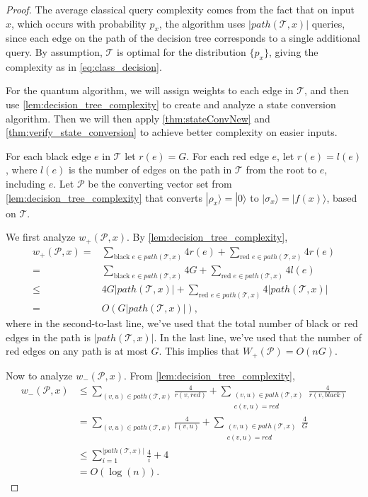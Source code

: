 \documentclass[cleveref, autoref, thm-restate,11pt]{article}
\theoremstyle{definition}
\newcommand{\sop}[1]{{\mathcal #1}}
\newcommand{\ket}[1]{|#1\rangle}
\renewcommand{\wp}[2]{{w_+({#1},{#2})}}
\newcommand{\wm}[2]{{w_-({#1},{#2})}}
\begin{document}
\begin{proof} 
The average classical query complexity comes from the fact that on input $x$,
which occurs with probability $p_x$, the algorithm uses $|path(\sop T,x)|$
queries, since each edge on the path of the decision tree corresponds
to a single additional query. By assumption, $\sop T$ is optimal for
the distribution $\{p_x\}$, giving the complexity as in \cref{eq:class_decision}.

For the quantum algorithm, we will assign weights to
each edge in $\sop T$, and then use \cref{lem:decision_tree_complexity} to create and analyze
a state conversion algorithm. Then we will then apply \cref{thm:stateConvNew} and
\cref{thm:verify_state_conversion} to achieve better complexity on easier inputs. 

For each black edge $e$ in $\sop T$ let $r(e)=G$. For each red 
edge $e$, let $r(e)=l(e)$, where $l(e)$ is the number of edges on the path in $\sop T$ from 
the root to $e$, including $e$. Let $\mathscr P$ be the 
converting vector set from \cref{lem:decision_tree_complexity} that converts 
$\ket{\rho_x}=\ket{0}$ to $\ket{\sigma_x}=\ket{f(x)}$, based on $\sop T$. 

We first analyze $\wp{\mathscr P}{x}$. By \cref{lem:decision_tree_complexity},
\begin{align}
\wp{\mathscr P}{x}
=&\sum_{\textrm{black } e\in path(\sop T,x)}4r(e)+\sum_{\textrm{red }e\in path(\sop T,x)}4r(e)\nonumber\\
=&\sum_{\textrm{black } e\in path(\sop T,x)}4G+\sum_{\textrm{red }e\in path(\sop T,x)}4l(e)\nonumber\\
\leq&4G|path(\sop T,x)|+\sum_{\textrm{red }e\in path(\sop T,x)}4|path(\sop T,x)|\nonumber\\
= &O\left(G|path(\sop T,x)|\right),
\end{align} 
where in the second-to-last line, we've used that the total number
of black or red edges in the path is $|path(\sop T,x)|$. In the last line,
we've used that the number of red edges on any path is at most $G$. 
This implies that $W_+(\mathscr P)=O(nG).$


Now to analyze $\wm{\mathscr P}{x}$. From \cref{lem:decision_tree_complexity},
\begin{align}
\wm{\mathscr P}{x}&\leq \sum_{(v,u)\in path(\sop T,x)}\frac{4}{r(v,red)}
+\sum_{\substack{(v,u)\in path(\sop T,x)\\
c(v,u)=red}}\frac{4}{r(v,black)}
\nonumber\\
&= \sum_{(v,u)\in path(\sop T,x)}\frac{4}{l(v,u)}
+\sum_{\substack{(v,u)\in path(\sop T,x)\\
c(v,u)=red}}\frac{4}{G}
\nonumber\\
&\leq \sum_{i=1}^{|path(\sop T,x)|}\frac{4}{i}
+4
\nonumber\\
&=O(\log(n)).
\end{align}


\end{proof}
\end{document}
